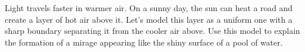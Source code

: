 Light travels faster in warmer air. On a sunny day, the sun can heat a
road and create a layer of hot air above it.  Let's model this layer
as a uniform one with a sharp boundary separating it from the cooler
air above.  Use this model to explain the formation of a mirage
appearing like the shiny surface of a pool of water.
